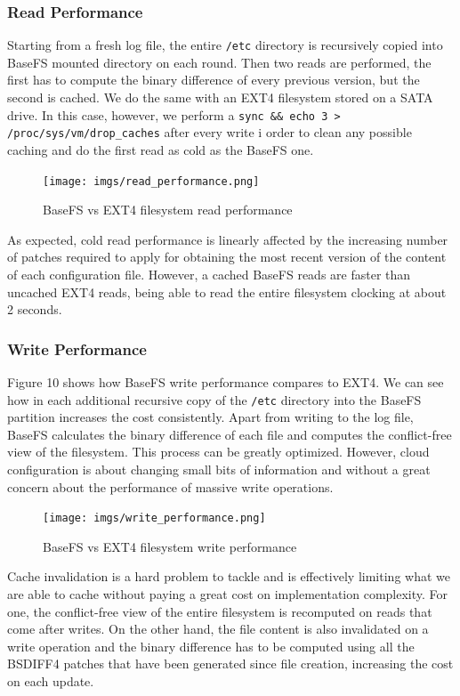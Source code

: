 \documentclass{sig-alternate}
\begin{document}
\subsubsection{Read Performance}

Starting from a fresh log file, the entire \texttt{/etc} directory is recursively copied into BaseFS mounted directory on each round. Then two reads are performed, the first has to compute the binary difference of every previous version, but the second is cached. We do the same with an EXT4 filesystem stored on a SATA drive. In this case, however, we perform a \texttt{sync \&\& echo 3 > /proc/sys/vm/drop\_caches} after every write i order to clean any possible caching and do the first read as cold as the BaseFS one.

\begin{figure}
\centering
\texttt{[image: imgs/read\_performance.png]}
\caption{BaseFS vs EXT4 filesystem read performance}
\label{fig:read-performance}
\end{figure}

As expected, cold read performance is linearly affected by the increasing number of patches required to apply for obtaining the most recent version of the content of each configuration file. However, a cached BaseFS reads are faster than uncached EXT4 reads, being able to read the entire filesystem clocking at about 2 seconds.

\subsubsection{Write Performance}


Figure 10 shows how BaseFS write performance compares to EXT4. We can see how in each additional recursive copy of the \texttt{/etc} directory into the BaseFS partition increases the cost consistently. Apart from writing to the log file, BaseFS calculates the binary difference of each file and computes the conflict-free view of the filesystem. This process can be greatly optimized. However, cloud configuration is about changing small bits of information and without a great concern about the performance of massive write operations.


\begin{figure}
\centering
\texttt{[image: imgs/write\_performance.png]}
\caption{BaseFS vs EXT4 filesystem write performance}
\label{fig:write-performance}
\end{figure}

Cache invalidation is a hard problem to tackle and is effectively limiting what we are able to cache without paying a great cost on implementation complexity. For one, the conflict-free view of the entire filesystem is recomputed on reads that come after 
writes. On the other hand, the file content is also invalidated on a write operation and the binary difference has to be computed using all the BSDIFF4 patches that have been generated since file creation, increasing the cost on each update.
\end{document}
